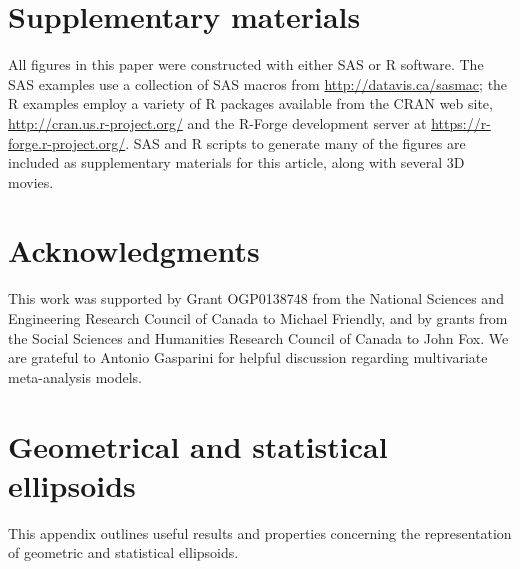 \documentclass[11pt]{article}%
\begin{document}
\section{Supplementary materials}

All figures in this paper were constructed with either SAS or R software.
The SAS examples use a collection of SAS macros from \url{http://datavis.ca/sasmac}; the
R examples employ a variety of R packages available from the CRAN web site, \url{http://cran.us.r-project.org/}
and the R-Forge development server at \url{https://r-forge.r-project.org/}.
SAS and R scripts to generate many of the figures are included as supplementary materials for this article,
along with several 3D movies.


\section{Acknowledgments}

This work was supported by Grant OGP0138748 from the National Sciences and Engineering Research Council of Canada to Michael Friendly,
and by grants from the Social Sciences and Humanities Research Council of Canada to John Fox.
We are grateful to Antonio Gasparini for helpful discussion regarding multivariate meta-analysis models.


%
\appendix
\section{Geometrical and statistical ellipsoids}
This appendix outlines useful results and properties concerning the representation of geometric and statistical         ellipsoids.



\end{document}
